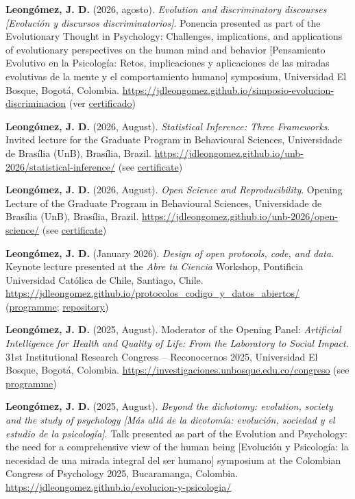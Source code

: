 \documentclass[11pt,a4paper,]{awesome-cv}
\begin{document}
\textbf{Leongómez, J. D.} (2026, agosto). \emph{Evolution and
discriminatory discourses {[}Evolución y discursos discriminatorios{]}}.
Ponencia presented as part of the Evolutionary Thought in Psychology:
Challenges, implications, and applications of evolutionary perspectives
on the human mind and behavior {[}Pensamiento Evolutivo en la
Psicología: Retos, implicaciones y aplicaciones de las miradas
evolutivas de la mente y el comportamiento humano{]} symposium,
Universidad El Bosque, Bogotá, Colombia.
\url{https://jdleongomez.github.io/simposio-evolucion-discriminacion}
(ver
\href{https://jdleongomez.info/es/files/Cert_simposio_evolucion_psicologia_2026.pdf}{certificado})

\textbf{Leongómez, J. D.} (2026, August). \emph{Statistical Inference:
Three Frameworks}. Invited lecture for the Graduate Program in
Behavioural Sciences, Universidade de Brasília (UnB), Brasília, Brazil.
\url{https://jdleongomez.github.io/unb-2026/statistical-inference/} (see
\href{https://jdleongomez.info/es/files/SEI_14742570_Declaracao.pdf}{certificate})

\textbf{Leongómez, J. D.} (2026, August). \emph{Open Science and
Reproducibility}. Opening Lecture of the Graduate Program in Behavioural
Sciences, Universidade de Brasília (UnB), Brasília, Brazil.
\url{https://jdleongomez.github.io/unb-2026/open-science/} (see
\href{https://jdleongomez.info/es/files/SEI_14742570_Declaracao.pdf}{certificate})

\textbf{Leongómez, J. D.} (January 2026). \emph{Design of open
protocols, code, and data}. Keynote lecture presented at the \emph{Abre
tu Ciencia} Workshop, Pontificia Universidad Católica de Chile,
Santiago, Chile.
\url{https://jdleongomez.github.io/protocolos_codigo_y_datos_abiertos/}
(\href{https://atc26.com/programa-dia2-conferencia1.html}{programme};
\href{https://github.com/JDLeongomez/protocolos_codigo_y_datos_abiertos}{repository})

\textbf{Leongómez, J. D.} (2025, August). Moderator of the Opening
Panel: \emph{Artificial Intelligence for Health and Quality of Life:
From the Laboratory to Social Impact}. 31st Institutional Research
Congress -- Reconocernos 2025, Universidad El Bosque, Bogotá, Colombia.
\url{https://investigaciones.unbosque.edu.co/congreso} (see
\href{https://investigaciones.unbosque.edu.co/s/Programacion-congreso_13AG.pdf}{programme})

\textbf{Leongómez, J. D.} (2025, August). \emph{Beyond the dichotomy:
evolution, society and the study of psychology {[}Más allá de la
dicotomía: evolución, sociedad y el estudio de la psicología{]}}. Talk
presented as part of the Evolution and Psychology: the need for a
comprehensive view of the human being {[}Evolución y Psicología: la
necesidad de una mirada integral del ser humano{]} symposium at the
Colombian Congress of Psychology 2025, Bucaramanga, Colombia.
\url{https://jdleongomez.github.io/evolucion-y-psicologia/}
\end{document}
